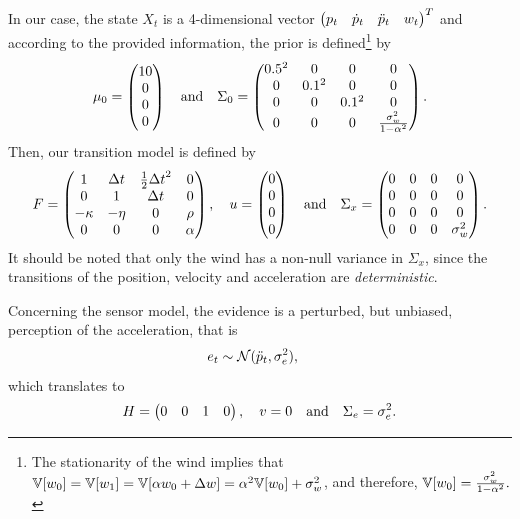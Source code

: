 \documentclass[11pt, a4paper]{article}
\begin{document}
\begin{enumerate}
\begin{solution}
        In our case, the state $X_t$ is a 4-dimensional vector $\begin{pmatrix}p_t & \dot{p}_t & \ddot{p}_t & w_t\end{pmatrix}^T$ and according to the provided information, the prior is defined\footnote{The stationarity of the wind implies that $\mathbb{V}[w_0] = \mathbb{V}[w_1] = \mathbb{V}[\alpha w_0 + \Delta w] = \alpha^2 \mathbb{V}[w_0] + \sigma_w^2$, and therefore, $\mathbb{V}[w_0] = \frac{\sigma_w^2}{1 - \alpha^2}.$} by
        \begin{equation*}
            \mu_0 = \begin{pmatrix}10 \\ 0 \\ 0 \\ 0\end{pmatrix} \quad \text{and} \quad \Sigma_0 = \begin{pmatrix}0.5^2 & 0 & 0 & 0 \\ 0 & 0.1^2 & 0 & 0 \\ 0 & 0 & 0.1^2 & 0 \\ 0 & 0 & 0 & \frac{\sigma_w^2}{1 - \alpha^2}\end{pmatrix} .
        \end{equation*}
        Then, our transition model is defined by
        \begin{equation*}
            F = \begin{pmatrix}1 & \Delta t & \frac{1}{2} {\Delta t}^2 & 0 \\ 0 & 1 & \Delta t & 0 \\ -\kappa & -\eta & 0 & \rho \\ 0 & 0 & 0 & \alpha\end{pmatrix}, \quad u = \begin{pmatrix}0 \\ 0 \\ 0 \\ 0\end{pmatrix} \quad \text{and} \quad \Sigma_x = \begin{pmatrix}0 & 0 & 0 & 0 \\ 0 & 0 & 0 & 0 \\ 0 & 0 & 0 & 0 \\ 0 & 0 & 0 & \sigma_w^2\end{pmatrix} .
        \end{equation*}
        It should be noted that only the wind has a non-null variance in $\Sigma_x$, since the transitions of the position, velocity and acceleration are \emph{deterministic}.

        Concerning the sensor model, the evidence is a perturbed, but unbiased, perception of the acceleration, that is
        \begin{align*}
            e_t & \sim \mathcal{N}(\ddot{p}_t, \sigma_e^2) ,
        \end{align*}
        which translates to
        \begin{equation*}
            H = \begin{pmatrix}0 & 0 & 1 & 0\end{pmatrix}, \quad v = 0 \quad \text{and} \quad \Sigma_e = \sigma_e^2 .
        \end{equation*}
    \end{solution}


\end{enumerate}
\end{document}
